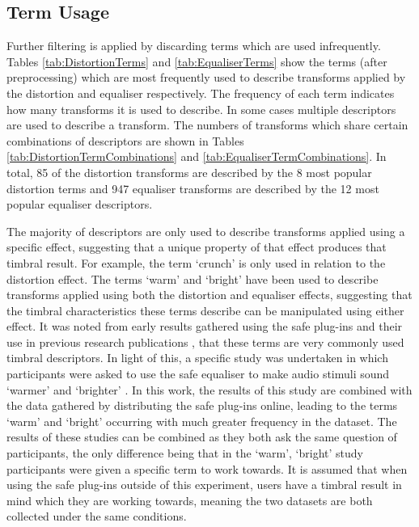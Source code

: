 	\subsection{Term Usage}
	\label{sec:TimbreEvaluation-Analysis-TermUsage}
		Further filtering is applied by discarding terms which are used infrequently. Tables
		\ref{tab:DistortionTerms} and \ref{tab:EqualiserTerms} show the terms (after preprocessing) which are most
		frequently used to describe transforms applied by the distortion and equaliser respectively. The frequency
		of each term indicates how many transforms it is used to describe. In some cases multiple descriptors are
		used to describe a transform. The numbers of transforms which share certain combinations of descriptors are
		shown in Tables \ref{tab:DistortionTermCombinations} and \ref{tab:EqualiserTermCombinations}. In total, 85
		of the distortion transforms are described by the 8 most popular distortion terms and 947 equaliser
		transforms are described by the 12 most popular equaliser descriptors.

		The majority of descriptors are only used to describe transforms applied using a specific effect,
		suggesting that a unique property of that effect produces that timbral result. For example, the term
		`crunch' is only used in relation to the distortion effect. The terms `warm' and `bright' have been used to
		describe transforms applied using both the distortion and equaliser effects, suggesting that the timbral
		characteristics these terms describe can be manipulated using either effect. It was noted from early
		results gathered using the \acrshort{safe} plug-ins and their use in previous research publications
		\citep{geddes2003auditory, lukasik2005towards, zacharakis2011an}, that these terms are very commonly used
		timbral descriptors. In light of this, a specific study was undertaken in which participants were asked to
		use the \acrshort{safe} equaliser to make audio stimuli sound `warmer' and `brighter' \citep{stasis2015a}.
		In this work, the results of this study are combined with the data gathered by distributing the
		\acrshort{safe} plug-ins online, leading to the terms `warm' and `bright' occurring with much greater
		frequency in the dataset. The results of these studies can be combined as they both ask the same question
		of participants, the only difference being that in the `warm', `bright' study participants were given a
		specific term to work towards. It is assumed that when using the \acrshort{safe} plug-ins outside of this
		experiment, users have a timbral result in mind which they are working towards, meaning the two datasets
		are both collected under the same conditions.

